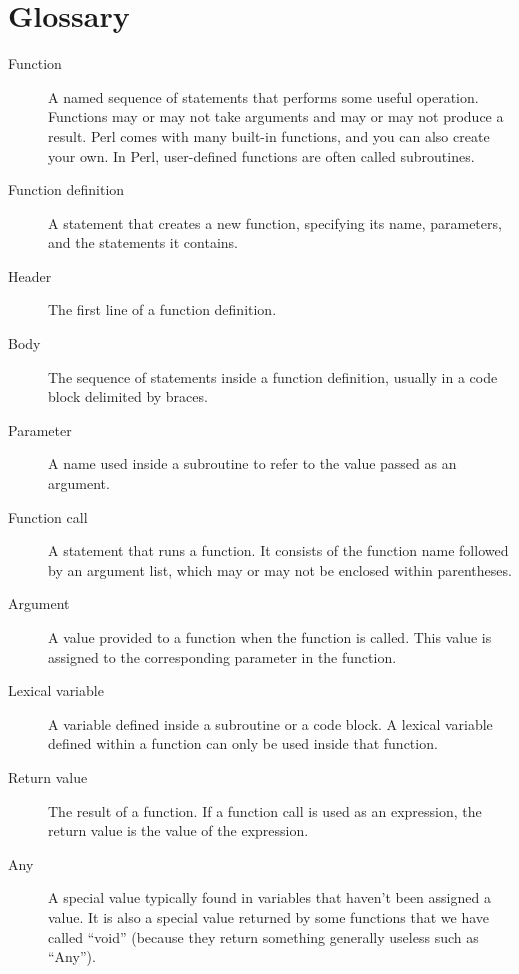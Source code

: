 \section{Glossary}

\begin{description}

\item[Function] A named sequence of statements that performs 
some useful operation. Functions may or may not take arguments 
and may or may not produce a result. Perl comes with many 
built-in functions, and you can also create your own. In Perl, 
user-defined functions are often called subroutines.

\item[Function definition]  A statement that creates a new function,
specifying its name, parameters, and the statements it contains.

\item[Header] The first line of a function definition.

\item[Body] The sequence of statements inside a function 
definition, usually in a code block delimited by braces.

\item[Parameter] A name used inside a subroutine to refer to 
the value passed as an argument.

\item[Function call] A statement that runs a function. It
consists of the function name followed by an argument list, 
which may or may not be enclosed within parentheses.

\item[Argument]  A value provided to a function when the function is called.
This value is assigned to the corresponding parameter in the function.

\item[Lexical variable]  A variable defined inside a subroutine 
or a code block.  A lexical variable defined within a function can 
only be used inside that function.

\item[Return value]  The result of a function.  If a function call
is used as an expression, the return value is the value of
the expression.

\item[Any]  A special value typically found in variables that 
haven't been assigned a value. It is also a special value 
returned by some functions that we have called ``void'' (because 
they return something generally useless such as ``Any'').


\end{description}
